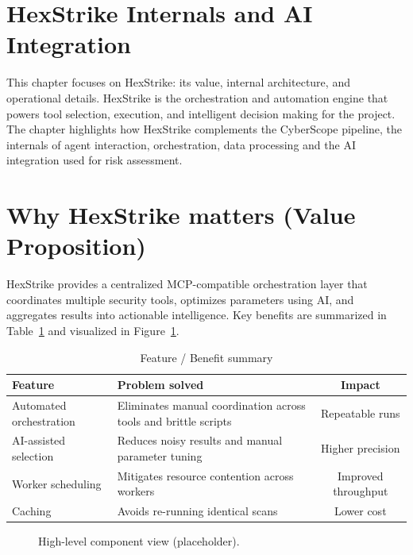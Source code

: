 \section{HexStrike Internals and AI Integration}

This chapter focuses on HexStrike: its value, internal architecture, and operational details. HexStrike is the orchestration and automation engine that powers tool selection, execution, and intelligent decision making for the project. The chapter highlights how HexStrike complements the CyberScope pipeline, the internals of agent interaction, orchestration, data processing and the AI integration used for risk assessment.

\section{Why HexStrike matters (Value Proposition)}

HexStrike provides a centralized MCP-compatible orchestration layer that coordinates multiple security tools, optimizes parameters using AI, and aggregates results into actionable intelligence. Key benefits are summarized in Table~\ref{tab:feature-benefits} and visualized in Figure~\ref{fig:feature-box}.

\begin{table}[ht]
\centering
\caption{Feature / Benefit summary}
\label{tab:feature-benefits}
\begin{tabularx}{\textwidth}{|l|X|c|}
\hline
Feature & Problem solved & Impact \\
\hline
Automated orchestration & Eliminates manual coordination across tools and brittle scripts & Repeatable runs \\
\hline
AI-assisted selection & Reduces noisy results and manual parameter tuning & Higher precision \\
\hline
Worker scheduling & Mitigates resource contention across workers & Improved throughput \\
\hline
Caching & Avoids re-running identical scans & Lower cost \\
\hline
\end{tabularx}
\end{table}

\begin{figure}[ht]
\centering
{}
\caption{High-level component view (placeholder).}
\label{fig:feature-box}
\end{figure}


